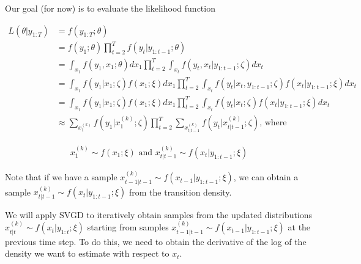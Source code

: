 \documentclass[]{article}
\begin{document}
Our goal (for now) is to evaluate the likelihood function

\begin{align*}
L(\theta \vert y_{1:T}) &= f(y_{1:T} ; \theta) \\
&= f(y_1 ; \theta) \prod_{t = 2}^T f(y_t \vert y_{1:t-1} ; \theta) \\
&= \int_{x_1} f(y_1, x_1 ; \theta) d x_1 \prod_{t = 2}^T \int_{x_t} f(y_t, x_t \vert y_{1:t-1} ; \zeta) d x_{t} \\
&= \int_{x_1} f(y_1 \vert x_1 ; \zeta) f(x_1 ; \xi) d x_1 \prod_{t = 2}^T \int_{x_t} f(y_t \vert x_t, y_{1:t-1} ; \zeta) f(x_t \vert y_{1:t-1} ;\xi) d x_t \\
&= \int_{x_1} f(y_1 \vert x_1 ; \zeta) f(x_1 ; \xi) d x_1 \prod_{t = 2}^T \int_{x_t} f(y_t \vert x_t ; \zeta) f(x_t \vert y_{1:t-1} ;\xi) d x_t \\
&\approx \sum_{x_1^{(k)}} f(y_1 \vert x_1^{(k)} ; \zeta) \prod_{t = 2}^T \sum_{x_{t|t-1}^{(k)}} f(y_t \vert x_{t|t-1}^{(k)} ; \zeta) \text{, where}
\end{align*}

\begin{align*}
x_1^{(k)} \sim f(x_1 ; \xi) \text{ and }
x_{t|t-1}^{(k)} \sim f(x_t \vert y_{1:t-1} ;\xi)
\end{align*}

Note that if we have a sample
\(x_{t-1|t-1}^{(k)} \sim f(x_{t-1} \vert y_{1:t-1} ;\xi)\), we can
obtain a sample \(x_{t|t-1}^{(k)} \sim f(x_t \vert y_{1:t-1} ;\xi)\)
from the transition density.

We will apply SVGD to iteratively obtain samples from the updated
distributions \(x_{t|t}^{(k)} \sim f(x_{t} \vert y_{1:t} ;\xi)\)
starting from samples
\(x_{t-1|t-1}^{(k)} \sim f(x_{t-1} \vert y_{1:t-1} ;\xi)\) at the
previous time step. To do this, we need to obtain the derivative of the
log of the density we want to estimate with respect to \(x_{t}\).
\end{document}
